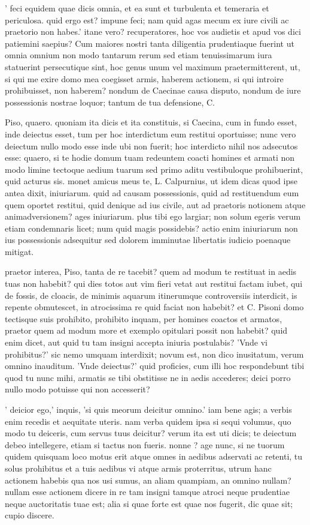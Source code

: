  ' feci equidem quae dicis omnia, et ea sunt et turbulenta et temeraria et periculosa. quid ergo est? impune feci; nam quid agas mecum ex iure civili ac praetorio non habes.' itane vero? recuperatores, hoc vos audietis et apud vos dici patiemini saepius? Cum maiores nostri tanta diligentia prudentiaque fuerint ut omnia omnium non modo tantarum rerum sed etiam tenuissimarum iura statuerint persecutique sint, hoc genus unum vel maximum praetermitterent, ut, si qui me exire domo mea coegisset armis, haberem actionem, si qui introire prohibuisset, non haberem? nondum de Caecinae causa disputo, nondum de iure possessionis nostrae loquor; tantum de tua defensione, C.

 Piso, quaero. quoniam ita dicis et ita constituis, si Caecina, cum in fundo esset, inde deiectus esset, tum per hoc interdictum eum restitui oportuisse; nunc vero deiectum nullo modo esse inde ubi non fuerit; hoc interdicto nihil nos adsecutos esse: quaero, si te hodie domum tuam redeuntem coacti homines et armati non modo limine tectoque aedium tuarum sed primo aditu vestibuloque prohibuerint, quid acturus sis. monet amicus meus te, L. Calpurnius, ut idem dicas quod ipse antea dixit, iniuriarum. quid ad causam possessionis, quid ad restituendum eum quem oportet restitui, quid denique ad ius civile, aut ad praetoris notionem atque animadversionem? ages iniuriarum. plus tibi ego largiar; non solum egeris verum etiam condemnaris licet; num quid magis possidebis? actio enim iniuriarum non ius possessionis adsequitur sed dolorem imminutae libertatis iudicio poenaque mitigat.

 praetor interea, Piso, tanta de re tacebit? quem ad modum te restituat in aedis tuas non habebit? qui dies totos aut vim fieri vetat aut restitui factam iubet, qui de fossis, de cloacis, de minimis aquarum itinerumque controversiis interdicit, is repente obmutescet, in atrocissima re quid faciat non habebit? et C. Pisoni domo tectisque suis prohibito, prohibito inquam, per homines coactos et armatos, praetor quem ad modum more et exemplo opitulari possit non habebit? quid enim dicet, aut quid tu tam insigni accepta iniuria postulabis? 'Vnde vi prohibitus?' sic nemo umquam interdixit; novum est, non dico inusitatum, verum omnino inauditum. 'Vnde deiectus?' quid proficies, cum illi hoc respondebunt tibi quod tu nunc mihi, armatis se tibi obstitisse ne in aedis accederes; deici porro nullo modo potuisse qui non accesserit?

 ' deicior ego,' inquis, 'si quis meorum deicitur omnino.' iam bene agis; a verbis enim recedis et aequitate uteris. nam verba quidem ipsa si sequi volumus, quo modo tu deiceris, cum servus tuus deicitur? verum ita est uti dicis; te deiectum debeo intellegere, etiam si tactus non fueris. nonne ? age nunc, si ne tuorum quidem quisquam loco motus erit atque omnes in aedibus adservati ac retenti, tu solus prohibitus et a tuis aedibus vi atque armis proterritus, utrum hanc actionem habebis qua nos usi sumus, an aliam quampiam, an omnino nullam? nullam esse actionem dicere in re tam insigni tamque atroci neque prudentiae neque auctoritatis tuae est; alia si quae forte est quae nos fugerit, dic quae sit; cupio discere.

